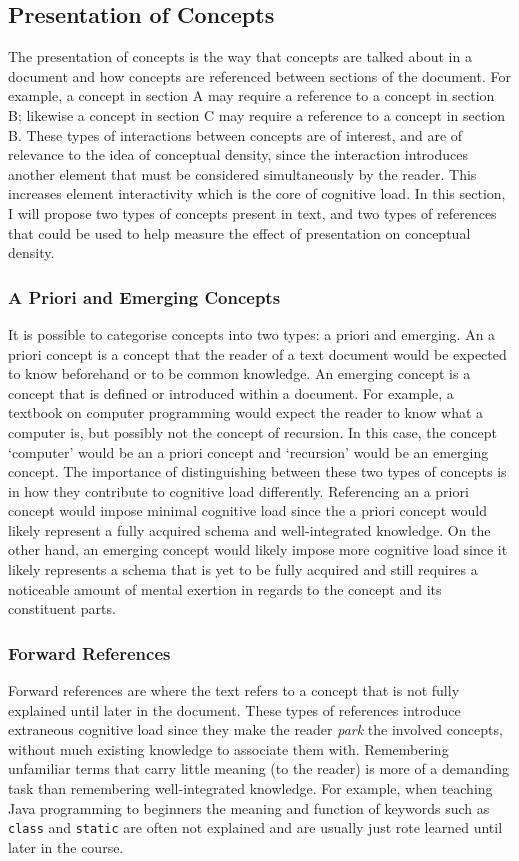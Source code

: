 \documentclass[12pt]{article}
\theoremstyle{grammarstyle}
\begin{document}
\subsection{Presentation of Concepts} \label{sec:presentation of concepts}
The presentation of concepts is the way that concepts are talked about in a document and how concepts are referenced between sections of the document. For example, a concept in section A may require a reference to a concept in section B; likewise a concept in section C may require a reference to a concept in section B. These types of interactions between concepts are of interest, and are of relevance to the idea of conceptual density, since the interaction introduces another element that must be considered simultaneously by the reader. 
This increases element interactivity which is the core of cognitive load. 
In this section, I will propose two types of concepts present in text, and two types of references that could be used to help measure the effect of presentation on conceptual density.

\subsubsection{A Priori and Emerging Concepts}
It is possible to categorise concepts into two types: a priori and emerging.
An a priori concept is a concept that the reader of a text document would be expected to know beforehand or to be common knowledge.
An emerging concept is a concept that is defined or introduced within a document.
For example, a textbook on computer programming would expect the reader to know what a computer is, but possibly not the concept of recursion. In this case, the concept `computer' would be an a priori concept and `recursion' would be an emerging concept.
The importance of distinguishing between these two types of concepts is in how they contribute to cognitive load differently. Referencing an a priori concept would impose minimal cognitive load since the a priori concept would likely represent a fully acquired schema and well-integrated knowledge. On the other hand, an emerging concept would likely impose more cognitive load since it likely represents a schema that is yet to be fully acquired and still requires a noticeable amount of mental exertion in regards to the concept and its constituent parts.

\subsubsection{Forward References}
Forward references are where the text refers to a concept that is not fully explained until later in the document. These types of references introduce extraneous cognitive load since they make the reader \textit{park} the involved concepts, without much existing knowledge to associate them with. Remembering unfamiliar terms that carry little meaning (to the reader) is more of a demanding task than remembering well-integrated knowledge. For example, when teaching Java programming to beginners the meaning and function of keywords such as \texttt{class} and \texttt{static} are often not explained and are usually just rote learned until later in the course.
\end{document}
